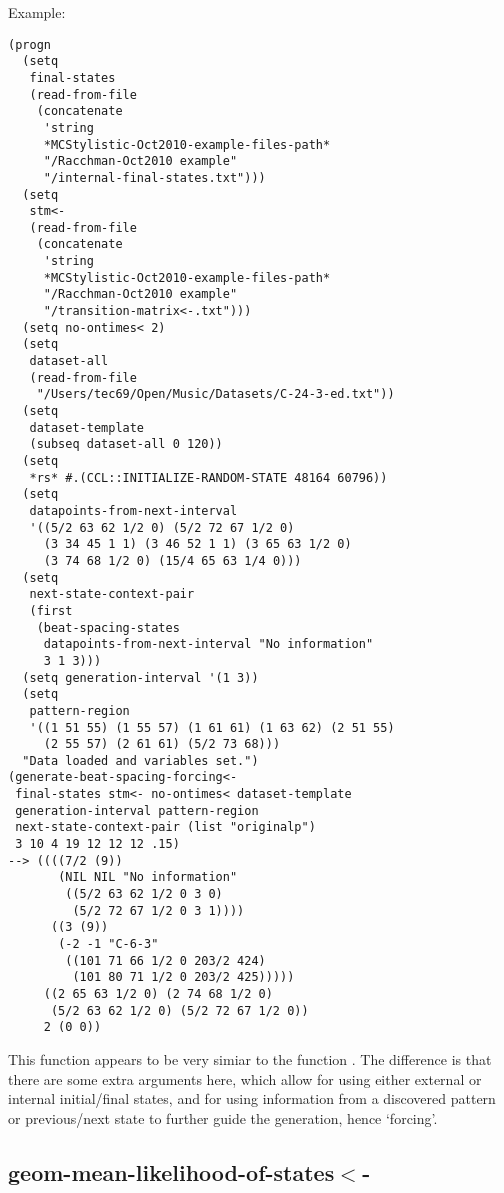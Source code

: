 \vspace{0.5cm}
\noindent Example:
\begin{verbatim}
(progn
  (setq
   final-states
   (read-from-file
    (concatenate
     'string
     *MCStylistic-Oct2010-example-files-path*
     "/Racchman-Oct2010 example"
     "/internal-final-states.txt")))
  (setq
   stm<-
   (read-from-file
    (concatenate
     'string
     *MCStylistic-Oct2010-example-files-path*
     "/Racchman-Oct2010 example"
     "/transition-matrix<-.txt")))
  (setq no-ontimes< 2)
  (setq
   dataset-all
   (read-from-file
    "/Users/tec69/Open/Music/Datasets/C-24-3-ed.txt"))
  (setq
   dataset-template
   (subseq dataset-all 0 120))
  (setq
   *rs* #.(CCL::INITIALIZE-RANDOM-STATE 48164 60796))
  (setq
   datapoints-from-next-interval
   '((5/2 63 62 1/2 0) (5/2 72 67 1/2 0)
     (3 34 45 1 1) (3 46 52 1 1) (3 65 63 1/2 0)
     (3 74 68 1/2 0) (15/4 65 63 1/4 0)))
  (setq
   next-state-context-pair
   (first
    (beat-spacing-states
     datapoints-from-next-interval "No information"
     3 1 3)))
  (setq generation-interval '(1 3))
  (setq
   pattern-region
   '((1 51 55) (1 55 57) (1 61 61) (1 63 62) (2 51 55)
     (2 55 57) (2 61 61) (5/2 73 68)))
  "Data loaded and variables set.")
(generate-beat-spacing-forcing<-
 final-states stm<- no-ontimes< dataset-template
 generation-interval pattern-region
 next-state-context-pair (list "originalp")
 3 10 4 19 12 12 12 .15)
--> ((((7/2 (9))
       (NIL NIL "No information"
        ((5/2 63 62 1/2 0 3 0)
         (5/2 72 67 1/2 0 3 1))))
      ((3 (9))
       (-2 -1 "C-6-3"
        ((101 71 66 1/2 0 203/2 424)
         (101 80 71 1/2 0 203/2 425)))))
     ((2 65 63 1/2 0) (2 74 68 1/2 0)
      (5/2 63 62 1/2 0) (5/2 72 67 1/2 0))
     2 (0 0))
\end{verbatim}

\noindent This function appears to be very simiar to
the function . The
difference is that there are some extra arguments
here, which allow for using either external or
internal initial/final states, and for using
information from a discovered pattern or previous/next
state to further guide the generation, hence
`forcing'.


\subsection*{geom-mean-likelihood-of-states$<$-}\label{fun:geom-mean-likelihood-of-states<-}

